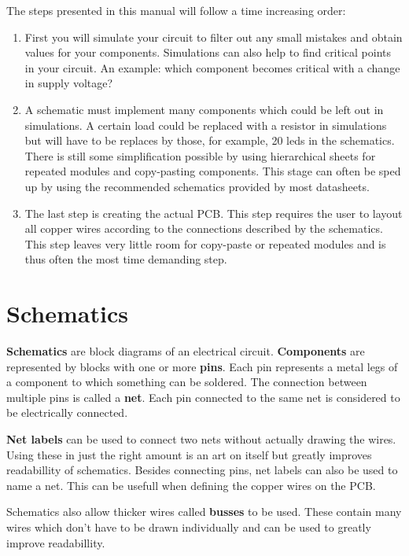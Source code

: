 \documentclass[12pt]{article}
\begin{document}
The steps presented in this manual will follow a time increasing order:
\begin{enumerate}
	\item First you will simulate your circuit to filter out any small mistakes and obtain values for your components. Simulations can also help to find critical points in your circuit. An example: which component becomes critical with a change in supply voltage?
	\item A schematic must implement many components which could be left out in simulations. A certain load could be replaced with a resistor in simulations but will have to be replaces by those, for example, 20 leds in the schematics. There is still some simplification possible by using hierarchical sheets for repeated modules and copy-pasting components. This stage can often be sped up by using the recommended schematics provided by most datasheets.
	\item The last step is creating the actual PCB. This step requires the user to layout all copper wires according to the connections described by the schematics. This step leaves very little room for copy-paste or repeated modules and is thus often the most time demanding step.
\end{enumerate}





\section{Schematics}
\textbf{Schematics} are block diagrams of an electrical circuit. \textbf{Components} are represented by blocks with one or more \textbf{pins}. Each pin represents a metal legs of a component to which something can be soldered. The connection between multiple pins is called a \textbf{net}. Each pin connected to the same net is considered to be electrically connected.

\textbf{Net labels} can be used to connect two nets without actually drawing the wires. Using these in just the right amount is an art on itself but greatly improves readabillity of schematics.
Besides connecting pins, net labels can also be used to name a net. This can be usefull when defining the copper wires on the PCB.

Schematics also allow thicker wires called \textbf{busses} to be used. These contain many wires which don't have to be drawn individually and can be used to greatly improve readabillity.
\end{document}
